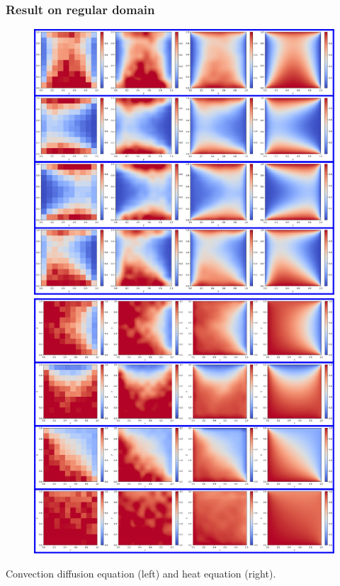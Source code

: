 \documentclass{beamer}
\begin{document}
\begin{frame}
\frametitle{Result on regular domain}
\begin{figure}
	\includegraphics[height=0.4\textwidth]{covecdiffpdf.pdf}
	\includegraphics[height=0.4\textwidth]{Heat.png}
\end{figure}
Convection diffusion equation (left) and heat equation (right).
\end{frame}
\end{document}
